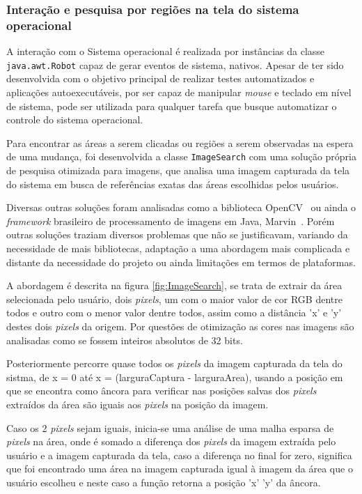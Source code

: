 \documentclass[tg]{mdtufsm}
\begin{document}
                \subsubsection {Interação e pesquisa por regiões na tela do sistema operacional}

                    A interação com o Sistema operacional é realizada por instâncias da classe \texttt{java.awt.Robot} capaz de gerar eventos de sistema, nativos. Apesar de ter sido desenvolvida com o objetivo principal de realizar testes automatizados e aplicações autoexecutáveis, por ser capaz de manipular \emph{mouse} e teclado em nível de sistema, pode ser utilizada para qualquer tarefa que busque automatizar o controle do sistema operacional.

                    Para encontrar as áreas a serem clicadas ou regiões a serem observadas na espera de uma mudança, foi desenvolvida a classe \texttt{ImageSearch} com uma solução própria de pesquisa otimizada para imagens, que analisa uma imagem capturada da tela do sistema em busca de referências exatas das áreas escolhidas pelos usuários.

                    Diversas outras soluções foram analisadas como a biblioteca OpenCV~\cite{openCV} ou ainda o \emph{framework} brasileiro de processamento de imagens em Java, Marvin~\cite{marvin}. Porém outras soluções traziam diversos problemas que não se justificavam, variando da necessidade de mais bibliotecas, adaptação a uma abordagem mais complicada e distante da necessidade do projeto ou ainda limitações em termos de plataformas.

                    A abordagem é descrita na figura \ref{fig:ImageSearch}, se trata de extrair da área selecionada pelo usuário, dois \emph{pixels}, um com o maior valor de cor RGB dentre todos e outro com o menor valor dentre todos, assim como a distância 'x' e 'y' destes dois \emph{pixels} da origem. Por questões de otimização as cores nas imagens são analisadas como se fossem inteiros absolutos de 32 bits.

                    Posteriormente percorre quase todos os \emph{pixels} da imagem capturada da tela do sistma, de x = 0 até x = (larguraCaptura - larguraArea), usando a posição em que se encontra como âncora para verificar nas posições salvas dos \emph{pixels} extraídos da área são iguais aos \emph{pixels} na posição da imagem.

                    Caso os 2 \emph{pixels} sejam iguais, inicia-se uma análise de uma malha esparsa de \emph{pixels} na área, onde é somado a diferença dos \emph{pixels} da imagem extraída pelo usuário e a imagem capturada da tela, caso a diferença no final for zero, significa que foi encontrado uma área na imagem capturada igual à imagem da área que o usuário escolheu e neste caso a função retorna a posição 'x' 'y' da âncora.
\end{document}

